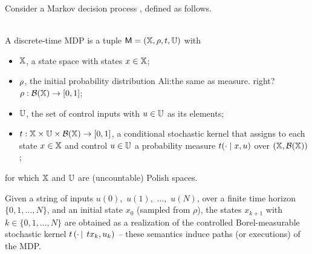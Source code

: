 \documentclass{ifacconf}
\renewcommand{\axx}[1]{{\color{orange} Ali:#1}}
\begin{document}
    
Consider a Markov decision process \citep{bertsekas2004stochastic,mt1993,hll1996}, defined as follows.%
\begin{definition}\label{def:MDP} \mbox{ }\\
  A discrete-time MDP is a tuple $\mathsf{M} = ({\mathbb{X}}, \rho, t, {\mathbb{U}})$ with
  \begin{itemize}
    \item ${\mathbb{X}}$,  a state space with states $x\in{\mathbb{X}}$; %
    \item $\rho$, the initial probability distribution \axx{the same as measure. right?} $\rho:\mathcal{B}({\mathbb{X}})\rightarrow [0,1]$;
    \item ${\mathbb{U}}$, the set of control inputs with $u\in{\mathbb{U}}$ as its elements;
    \item $t:{\mathbb{X}}\times{\mathbb{U}}\times\mathcal B({\mathbb{X}})\rightarrow[0,1]$, a conditional stochastic kernel that assigns to each state $x\in {\mathbb{X}}$ and control $u\in {\mathbb{U}}$ a probability measure $t(\cdot\mid x,u)$ over $({\mathbb{X}},\mathcal B({\mathbb{X}}))$;
  \end{itemize}
  for which ${\mathbb{X}}$ and ${\mathbb{U}}$ are (uncountable) Polish spaces.
 \end{definition} 
 
Given a string of inputs
$u(0),$ $u(1), $ $\ldots, $ $u(N)$,
over a finite time horizon $\{0,1,\ldots, N\}$,
and an initial state  $x_0$ (sampled from $\rho$), 
the states $x_{k+1}$ with $k\in \{0,1,\ldots, N\}$
are obtained as a realization of the controlled Borel-measurable stochastic kernel $t\left(\cdot{\,\mid\,t} x_k, u_k \right)$ --
these semantics induce paths (or executions) of the MDP. %
  
\end{document}
